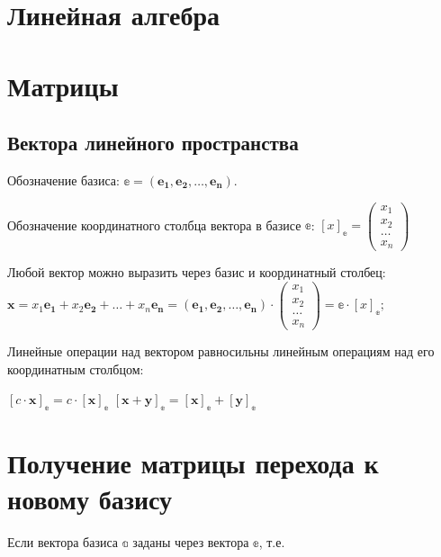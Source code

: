 
\section{Линейная алгебра}

\section{Матрицы}

\subsection{Вектора линейного пространства}

Обозначение базиса: $\mathbb{e} = (\boldsymbol{e_1}, \boldsymbol{e_2}, \ldots, \boldsymbol{e_n})$.

Обозначение координатного столбца вектора в базисе $\mathbb{e}$: $[x]_\mathbb{e} = 
\begin{pmatrix}
	x_1\\
	x_2\\
	\ldots\\
	x_n
\end{pmatrix} $  

Любой вектор можно выразить через базис и координатный столбец: 
$\displaystyle
	\boldsymbol{x} = x_1\boldsymbol{e_1} + x_2\boldsymbol{e_2} + \ldots + x_n\boldsymbol{e_n} = (\boldsymbol{e_1}, \boldsymbol{e_2}, \ldots, \boldsymbol{e_n}) \cdot 
	\begin{pmatrix}
		x_1\\
		x_2\\
		\ldots\\
		x_n
	\end{pmatrix} = \mathbb{e}\cdot [x]_\mathbb{e}; 
$

Линейные операции над вектором равносильны линейным операциям над его координатным столбцом:

$\displaystyle [c\cdot \boldsymbol{x}]_\mathbb{e} = c\cdot [\boldsymbol{x}]_\mathbb{e} $
$\displaystyle [\boldsymbol{x} + \boldsymbol{y}]_\mathbb{e} = [\boldsymbol{x}]_\mathbb{e} + [\boldsymbol{y}]_\mathbb{e} $

\section{Получение матрицы перехода к новому базису}

Если вектора базиса $\mathbb{a}$ заданы через вектора $\mathbb{e}$, т.е.

